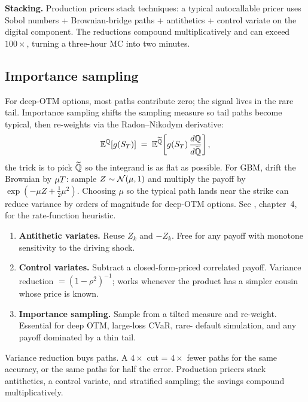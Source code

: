 \textbf{Stacking.}  Production pricers stack techniques: a typical
autocallable pricer uses Sobol numbers + Brownian-bridge paths +
antithetics + control variate on the digital component.  The
reductions compound multiplicatively and can exceed $100\times$,
turning a three-hour MC into two minutes.

\subsection{Importance sampling}

For deep-OTM options, most paths contribute zero; the signal lives
in the rare tail.  Importance sampling shifts the sampling measure so
tail paths become typical, then re-weights via the Radon--Nikodym
derivative:
\begin{equation}
  \mathbb{E}^{\mathbb{Q}}[g(S_T)]
  \;=\; \mathbb{E}^{\widetilde{\mathbb{Q}}}\!\left[ g(S_T)\,
        \frac{d\mathbb{Q}}{d\widetilde{\mathbb{Q}}} \right],
\end{equation}
the trick is to pick $\widetilde{\mathbb{Q}}$ so the integrand is as flat as
possible.  For GBM, drift the Brownian by $\mu T$: sample $Z \sim
\mathcal{N}(\mu, 1)$ and multiply the payoff by $\exp(-\mu Z + \tfrac12
\mu^2)$.  Choosing $\mu$ so the typical path lands near the strike
can reduce variance by orders of magnitude for deep-OTM options.  See
\citeGlasserman, chapter~4, for the rate-function heuristic.

\begin{keyfactbox}
\begin{enumerate}
  \item \textbf{Antithetic variates.}  Reuse $Z_k$ and $-Z_k$.  Free
    for any payoff with monotone sensitivity to the driving shock.
  \item \textbf{Control variates.}  Subtract a closed-form-priced
    correlated payoff.  Variance reduction $= (1-\rho^2)^{-1}$; works
    whenever the product has a simpler cousin whose price is known.
  \item \textbf{Importance sampling.}  Sample from a tilted measure
    and re-weight.  Essential for deep OTM, large-loss CVaR, rare-
    default simulation, and any payoff dominated by a thin tail.
\end{enumerate}
\end{keyfactbox}

\begin{intuitionbox}
Variance reduction buys paths.  A $4\times$ cut = $4\times$ fewer
paths for the same accuracy, or the same paths for half the error.
Production pricers stack antithetics, a control variate, and
stratified sampling; the savings compound multiplicatively.
\end{intuitionbox}

